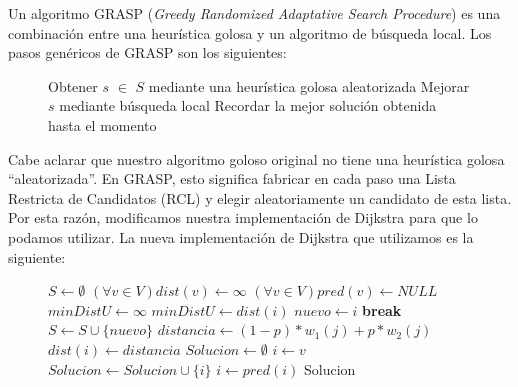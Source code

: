 Un algoritmo GRASP (\emph{Greedy Randomized Adaptative Search Procedure}) es una combinación entre una heurística golosa y un algoritmo de búsqueda local. Los pasos genéricos de GRASP son los siguientes:

\begin{center}
 \begin{figure}[H]
  \begin{pseudo}
    \State Obtener $s$ $\in$ $S$ mediante una heurística golosa aleatorizada
    \State Mejorar $s$ mediante búsqueda local
    \State Recordar la mejor solución obtenida hasta el momento
    \EndWhile
    \EndProcedure
  \end{pseudo}
 \end{figure}
\end{center}

Cabe aclarar que nuestro algoritmo goloso original no tiene una heurística golosa ``aleatorizada''. En GRASP, esto significa fabricar en cada paso una Lista Restricta de Candidatos (RCL) y elegir aleatoriamente un candidato de esta lista. Por esta razón, modificamos nuestra implementación de Dijkstra para que lo podamos utilizar. La nueva implementación de Dijkstra que utilizamos es la siguiente:


\begin{center}
 \begin{figure}[H]
  \begin{pseudo}
    \State $S \leftarrow \emptyset$
    \State $(\forall v \in V) dist(v) \leftarrow \infty$
    \State $(\forall v \in V) pred(v) \leftarrow NULL$
    \State $minDistU \leftarrow \infty$
	\State $minDistU \leftarrow dist(i)$
	\State $nuevo \leftarrow i$
      \EndIf
    \EndFor
      \State \textbf{break}
    \EndIf
    \State $S \leftarrow S \cup \{nuevo\}$
      \State $distancia \leftarrow (1-p)*w_1(j) + p*w_2(j)$
	\State $dist(i) \leftarrow distancia$
      \EndIf
    \EndFor
    \EndWhile
    \State $Solucion \leftarrow \emptyset$
    \State $i \leftarrow v$
      \State $Solucion \leftarrow Solucion \cup \{i\}$
      \State $i \leftarrow pred(i)$
    \EndWhile
    \Return Solucion
    \EndProcedure
  \end{pseudo}
 \end{figure}
\end{center}

